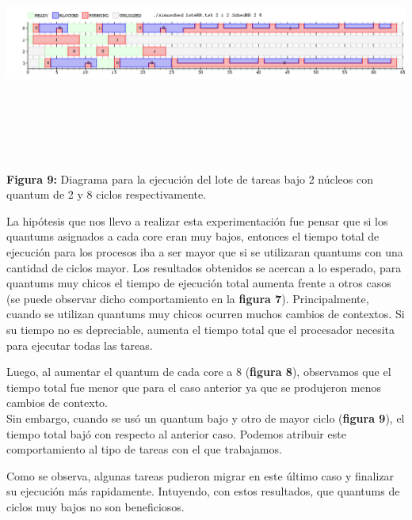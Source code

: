 \documentclass[a4paper]{article}
\begin{document}
 \includegraphics[width=\textwidth,height=3.0in,keepaspectratio]{imagenes/ej4/eje3.png} \\
\begin {flushleft}
\textbf{Figura 9:} Diagrama para la ejecuci\'on del lote de tareas bajo 2 n\'ucleos con quantum de 2 y 8 ciclos respectivamente.
\end{flushleft}

\newpage

La hipótesis que nos llevo a realizar esta experimentación fue pensar que si los quantums asignados a cada core eran muy bajos, entonces el tiempo total de ejecución para los procesos iba a ser mayor que si se utilizaran quantums con una cantidad de ciclos mayor. 
Los resultados obtenidos se acercan a lo esperado, para quantums muy chicos el tiempo de ejecución total aumenta frente a otros casos (se puede observar dicho comportamiento en la\textbf{ figura 7}).  Principalmente, cuando se utilizan quantums muy chicos ocurren muchos cambios de contextos. Si su tiempo no es depreciable, aumenta el tiempo total que el procesador necesita para ejecutar todas las tareas. 
 
 Luego, al aumentar el quantum de cada core a 8 (\textbf{figura 8}), observamos que el tiempo total fue menor que para el caso anterior ya que se produjeron menos cambios de contexto. \\
 
 Sin embargo, cuando se usó un quantum bajo y otro de mayor ciclo (\textbf{figura 9}), el tiempo total bajó con respecto al anterior caso. Podemos atribuir este comportamiento al tipo de tareas con el que trabajamos. 
 
 Como se observa, algunas tareas pudieron migrar en este último caso y finalizar su ejecución más rapidamente. Intuyendo, con estos resultados, que quantums de ciclos muy bajos no son beneficiosos.\\
 
\end{document}
